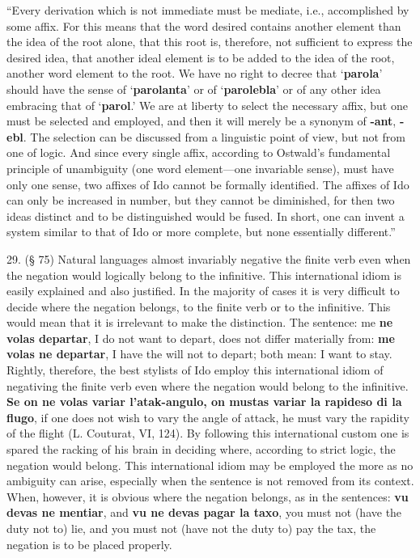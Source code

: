 ``Every derivation which is not immediate must be mediate, i.e., accomplished by some affix. For this means that the word desired contains another element than the idea of the root alone, that this root is, therefore, not sufficient to express the desired idea, that another ideal element is to be added to the idea of the root, another word element to the root. We have no right to decree that `\textbf{parola}' should have the sense of `\textbf{parolanta}' or of `\textbf{parolebla}' or of any other idea embracing that of `\textbf{parol}.' We are at liberty to select the necessary affix, but one must be selected and employed, and then it will merely be a synonym of \textbf{-ant}, \textbf{-ebl}. The selection can be discussed from a linguistic point of view, but not from one of logic. And since every single affix, according to Ostwald's fundamental principle of unambiguity (one word element—one invariable sense), must have only one sense, two affixes of Ido cannot be formally identified. The affixes of Ido can only be increased in number, but they cannot be diminished, for then two ideas distinct and to be distinguished would be fused. In short, one can invent a system similar to that of Ido or more complete, but none essentially different.''

29. (§ 75) Natural languages almost invariably negative the finite verb even when the negation would logically belong to the infinitive. This international idiom is easily explained and also justified. In the majority of cases it is very difficult to decide where the negation belongs, to the finite verb or to the infinitive. This would mean that it is irrelevant to make the distinction. The sentence: me \textbf{ne volas departar}, I do not want to depart, does not differ materially from: \textbf{me volas ne departar}, I have the will not to depart; both mean: I want to stay. Rightly, therefore, the best stylists of Ido employ this international idiom of negativing the finite verb even where the negation would belong to the infinitive. \textbf{Se on ne volas variar l'atak-angulo, on mustas variar la rapideso di la flugo}, if one does not wish to vary the angle of attack, he must vary the rapidity of the flight (L. Couturat, VI, 124). By following this international custom one is spared the racking of his brain in deciding where, according to strict logic, the negation would belong. This international idiom may be employed the more as no ambiguity can arise, especially when the sentence is not removed from its context. When, however, it is obvious where the negation belongs, as in the sentences: \textbf{vu devas ne mentiar}, and \textbf{vu ne devas pagar la taxo}, you must not (have the duty not to) lie, and you must not (have not the duty to) pay the tax, the negation is to be placed properly. %

